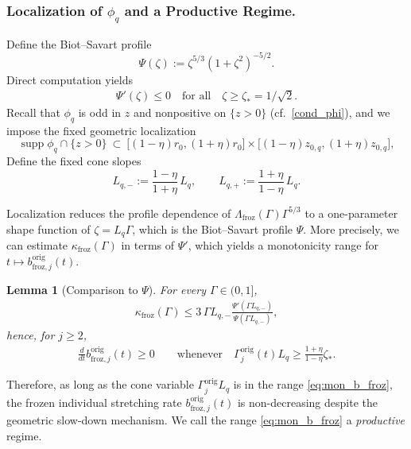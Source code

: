 \documentclass[reqno,11pt]{amsart}
\newtheorem{lemma}[theorem]{Lemma}
\newcommand{\supp}{\operatorname{supp}}
\begin{document}
\subsubsection{Localization of $\phi_q$ and a Productive Regime.}
\label{subsec:loc_prof}
Define the Biot--Savart profile
\begin{equation*}
\Psi(\zeta):=\zeta^{5/3}(1+\zeta^2)^{-5/2}.
\end{equation*}
Direct computation yields
\begin{align*}
\Psi'(\zeta)\leq 0
\quad \text{for all} \quad \zeta\geq \zeta_*=1/\sqrt2.
\end{align*}
Recall that $\phi_q$ is odd in $z$ and nonpositive on $\{z>0\}$ (cf.\ \eqref{cond_phi}), and we
impose the fixed geometric localization
\begin{equation}
\label{phi_cond2}
\supp \phi_q\cap\{z>0\}\ \subset\
\big[(1-\eta) r_0, (1+\eta)r_0\big]\times \big[(1-\eta) z_{0,q},(1+\eta ) z_{0,q}\big],
\end{equation}
Define the fixed cone slopes
\begin{equation}
\label{eq:def_Lpm}
L_{q,-}:=\frac{1-\eta}{1+\eta}\,L_q,
\qquad
L_{q,+}:=\frac{1+\eta}{1-\eta}\,L_q.
\end{equation}


Localization reduces the profile dependence of $\Lambda_{\mathrm{froz}}(\Gamma) \Gamma^{5/3}$ to a one-parameter shape function of $\zeta=L_q \Gamma$, which is the Biot--Savart profile $\Psi$. 
More precisely, we can estimate $\kappa_{\mathrm{froz}}(\Gamma)$ in terms of $\Psi'$, which yields a monotonicity range for $t\mapsto b_{\mathrm{froz},j}^{\mathrm{orig}}(t)$. 
\begin{lemma}[Comparison to $\Psi$]
\label{lem:comp_to_Psi}
For every $\Gamma\in(0,1]$,
    \begin{align}
    \label{eq:comp_kapp_psi}
        \kappa_{\mathrm{froz}} (\Gamma) 
        \leq 
        3 \, \Gamma L_{q,-}
        \frac{\Psi'(\Gamma L_{q,-})}{\Psi (\Gamma L_{q,-})},
    \end{align}
hence, for $j\geq 2$,
    \begin{align}
    \label{eq:mon_b_froz}
        \frac{d}{dt}b_{\mathrm{froz},j}^{\mathrm{orig}} (t) \geq 0 \qquad \text{whenever} \quad
        \Gamma_j^{\mathrm{orig}}(t) L_q \geq \frac{1+\eta}{1-\eta} \zeta_*.
    \end{align}
\end{lemma}
Therefore, as long as the cone variable $\Gamma_j^{\mathrm{orig}}L_q$ is in the range \eqref{eq:mon_b_froz}, the frozen individual stretching rate $b_{\mathrm{froz},j}^{\mathrm{orig}}(t)$ is non-decreasing despite the geometric slow-down mechanism. We call the range \eqref{eq:mon_b_froz} a \emph{productive} regime.
\end{document}
